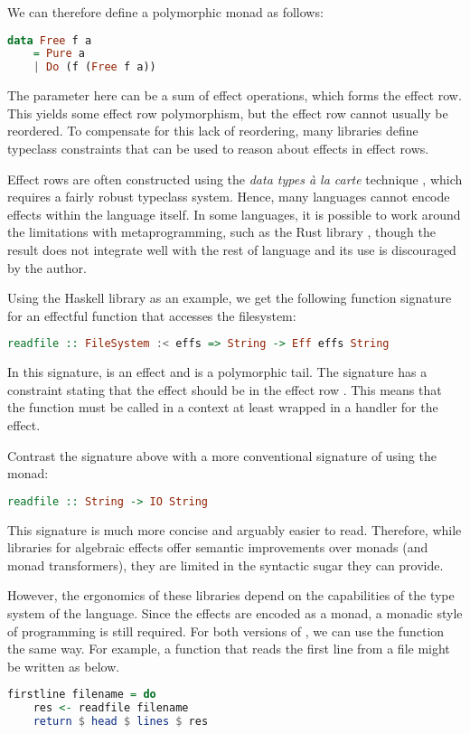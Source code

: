 We can therefore define a polymorphic  monad as follows:
\begin{lstlisting}[language=haskell]
data Free f a
    = Pure a
    | Do (f (Free f a))
\end{lstlisting}
The parameter  here can be a sum of effect operations, which forms the effect row. This yields some effect row polymorphism, but the effect row cannot usually be reordered. To compensate for this lack of reordering, many libraries define typeclass constraints that can be used to reason about effects in effect rows.

Effect rows are often constructed using the \emph{data types à la carte} technique \autocite{swierstra_data_2008}, which requires a fairly robust typeclass system. Hence, many languages cannot encode effects within the language itself. In some languages, it is possible to work around the limitations with metaprogramming, such as the Rust library , though the result does not integrate well with the rest of language and its use is discouraged by the author.

Using the  Haskell library as an example, we get the following function signature for an effectful function that accesses the filesystem:
\begin{lstlisting}[language=Haskell,style=fancy]
readfile :: FileSystem :< effs => String -> Eff effs String
\end{lstlisting}
In this signature,  is an effect and  is a polymorphic tail. The signature has a constraint stating that the  effect should be in the effect row . This means that the  function must be called in a context at least wrapped in a handler for the  effect.

Contrast the signature above with a more conventional signature of  using the  monad:
\begin{lstlisting}[language=Haskell,style=fancy]
readfile :: String -> IO String
\end{lstlisting}
This signature is much more concise and arguably easier to read. Therefore, while libraries for algebraic effects offer semantic improvements over monads (and monad transformers), they are limited in the syntactic sugar they can provide.

However, the ergonomics of these libraries depend on the capabilities of the type system of the language.   Since the effects are encoded as a monad, a monadic style of programming is still required. For both versions of , we can use the function the same way. For example, a function that reads the first line from a file might be written as below.
\begin{lstlisting}[language=Haskell,style=fancy,mathescape=false]
firstline filename = do
    res <- readfile filename
    return $ head $ lines $ res    
\end{lstlisting}


